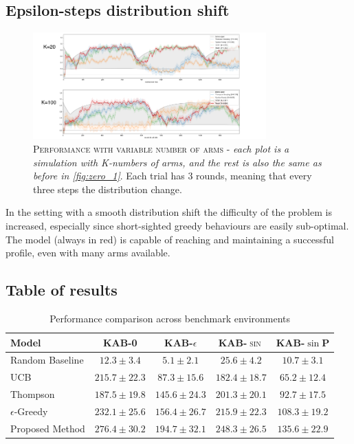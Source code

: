 \subsection{Epsilon-steps distribution shift}

\begin{figure}[ht]
    \centering
    \includegraphics[width=0.8\textwidth]{figures/drawing2.png}
    \caption{\textsc{Performance with variable number of arms} - \textit{each plot is a simulation with K-numbers of arms, and the rest is also the same as before in \ref{fig:zero_1}}. Each trial has 3 rounds, meaning that every three steps the distribution change.}
    \label{fig:eps_1}
\end{figure}

\noindent In the setting with a smooth distribution shift the difficulty of the problem is increased, especially since short-sighted greedy behaviours are easily sub-optimal. The model (always in red) is capable of reaching and maintaining a successful profile, even with many arms available.


\subsection{Table of results}

\begin{table}[htbp]
\centering
\caption{Performance comparison across benchmark environments}
\label{tab:model_performance}
\begin{tabular}{l c c c c}
\toprule
\textbf{Model} & \textbf{\textsc{KAB-0}} & \textbf{\textsc{KAB-$\epsilon$}} & \textbf{\textsc{KAB-$\sin$}} & \textbf{KAB-$\sin$P}\\
\midrule
Random Baseline & $12.3 \pm 3.4$ & $5.1 \pm 2.1$ & $25.6 \pm 4.2$ & $10.7 \pm 3.1$ \\
UCB & $215.7 \pm 22.3$ & $87.3 \pm 15.6$ & $182.4 \pm 18.7$ & $65.2 \pm 12.4$ \\
Thompson & $187.5 \pm 19.8$ & $145.6 \pm 24.3$ & $201.3 \pm 20.1$ & $92.7 \pm 17.5$ \\
$\epsilon$-Greedy & $232.1 \pm 25.6$ & $156.4 \pm 26.7$ & $215.9 \pm 22.3$ & $108.3 \pm 19.2$ \\
Proposed Method & $\mathbf{276.4 \pm 30.2}$ & $\mathbf{194.7 \pm 32.1}$ & $\mathbf{248.3 \pm 26.5}$ & $\mathbf{135.6 \pm 22.9}$ \\
\bottomrule
\end{tabular}
\end{table}

